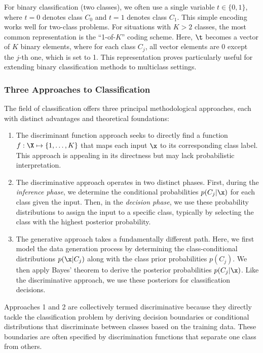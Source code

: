 For binary classification (two classes), we often use a single variable $t\in\{0,1\}$, where $t=0$ denotes class $C_{0}$ and $t=1$ denotes class $C_{1}$. This simple encoding works well for two-class problems. For situations with $K>2$ classes, the most common representation is the \alert{``1-of-$K$'' coding scheme}. Here, $\t$ becomes a vector of $K$ binary elements, where for each class $C_{j}$, all vector elements are 0 except the $j$-th one, which is set to 1. This representation proves particularly useful for extending binary classification methods to multiclass settings.


\subsubsection*{Three Approaches to Classification}

The field of classification offers three principal methodological approaches, each with distinct advantages and theoretical foundations:

\begin{enumerate}
\item The \alert{discriminant function} approach seeks to directly find a function $f:\X\mapsto\{1,\ldots,K\}$ that maps each input $\x$ to its corresponding class label. This approach is appealing in its directness but may lack probabilistic interpretation.

\item The \alert{discriminative approach} operates in two distinct phases. First, during the \emph{inference phase}, we determine the conditional probabilities $p(C_{j}|\x)$ for each class given the input. Then, in the \emph{decision phase}, we use these probability distributions to assign the input to a specific class, typically by selecting the class with the highest posterior probability.

\item The \alert{generative approach} takes a fundamentally different path. Here, we first model the data generation process by determining the class-conditional distributions $p(\x|C_{j})$ along with the class prior probabilities $p(C_{j})$. We then apply Bayes' theorem to derive the posterior probabilities $p(C_{j}|\x)$. Like the discriminative approach, we use these posteriors for classification decisions.
\end{enumerate}

Approaches 1 and 2 are collectively termed \alert{discriminative} because they directly tackle the classification problem by deriving decision boundaries or conditional distributions that discriminate between classes based on the training data. These boundaries are often specified by \alert{discrimination functions} that separate one class from others.


